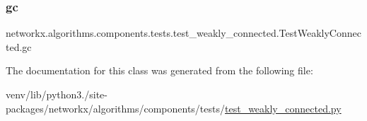 \subsubsection{\texorpdfstring{gc}{gc}}
{\footnotesize\ttfamily networkx.\+algorithms.\+components.\+tests.\+test\+\_\+weakly\+\_\+connected.\+Test\+Weakly\+Connected.\+gc}



The documentation for this class was generated from the following file\+:\begin{DoxyCompactItemize}
\item 
venv/lib/python3./site-\/packages/networkx/algorithms/components/tests/\hyperlink{test__weakly__connected_8py}{test\+\_\+weakly\+\_\+connected.\+py}\end{DoxyCompactItemize}
